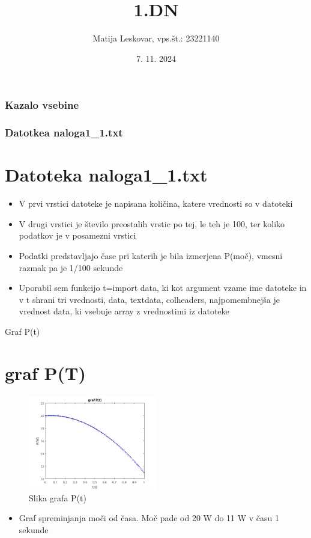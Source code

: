 \documentclass{beamer}
\title{1.DN}
\author{Matija Leskovar, vps.št.: 23221140}
\institute{Univerza v Ljubljani, Fakulteta za Strojništvo}
\date{7. 11. 2024}
\begin{document}
\frame{\titlepage}
\begin{frame}
\frametitle{Kazalo vsebine}
\tableofcontents

\end{frame}

\begin{frame}
\frametitle{Datotkea naloga1\_1.txt}
\section{Datoteka naloga1\_1.txt}
\begin{itemize}
    \item V prvi vrstici datoteke je napisana količina, katere vrednosti so v datoteki
    \item V drugi vrstici je število preostalih vrstic po tej, le teh je 100, ter koliko podatkov je v posamezni vrstici
    \item Podatki predstavljajo čase pri katerih je bila izmerjena P(moč), vmesni razmak pa je 1/100 sekunde
    \item Uporabil sem funkcijo t=import data, ki kot argument vzame ime datoteke in v t shrani tri vrednosti, data, textdata, colheaders, najpomembnejša je vrednost data, ki vsebuje array z vrednostimi iz datoteke
\end{itemize}
\end{frame}
\begin{frame}{Graf P(t)}
\section{graf P(T)}
\begin{figure}[h]
    \centering
    \includegraphics[width=0.5\textwidth]{P(t).jpg}
    \caption{Slika grafa P(t)}
    \label{fig:P(t)}
\end{figure}
\begin{itemize}
    \item Graf spreminjanja moči od časa. Moč pade od 20 W do 11 W v času 1 sekunde
\end{itemize}
\end{frame}
\end{document}
